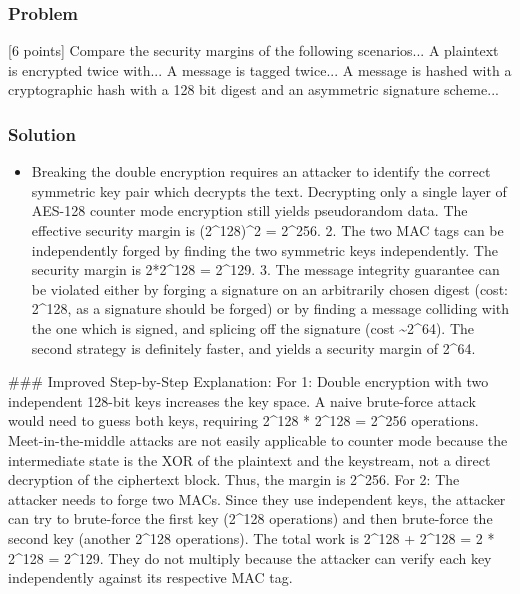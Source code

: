 \documentclass{article}
\begin{document}
\subsubsection*{Problem}
[6 points] Compare the security margins of the following scenarios... A plaintext is encrypted twice with... A message is tagged twice... A message is hashed with a cryptographic hash with a 128 bit digest and an asymmetric signature scheme...

\subsubsection*{Solution}
\begin{itemize}
    \item[\textbf{1.}] Breaking the double encryption requires an attacker to identify the correct symmetric key pair which decrypts the text. Decrypting only a single layer of AES-128 counter mode encryption still yields pseudorandom data. The effective security margin is (2\textasciicircum{}128)\textasciicircum{}2 = 2\textasciicircum{}256. 2. The two MAC tags can be independently forged by finding the two symmetric keys independently. The security margin is 2*2\textasciicircum{}128 = 2\textasciicircum{}129. 3. The message integrity guarantee can be violated either by forging a signature on an arbitrarily chosen digest (cost: 2\textasciicircum{}128, as a signature should be forged) or by finding a message colliding with the one which is signed, and splicing off the signature (cost \textasciitilde{}2\textasciicircum{}64). The second strategy is definitely faster, and yields a security margin of 2\textasciicircum{}64.

\end{itemize}
\#\#\# Improved Step-by-Step Explanation:
For 1: Double encryption with two independent 128-bit keys increases the key space. A naive brute-force attack would need to guess both keys, requiring 2\textasciicircum{}128 * 2\textasciicircum{}128 = 2\textasciicircum{}256 operations. Meet-in-the-middle attacks are not easily applicable to counter mode because the intermediate state is the XOR of the plaintext and the keystream, not a direct decryption of the ciphertext block. Thus, the margin is 2\textasciicircum{}256.
For 2: The attacker needs to forge two MACs. Since they use independent keys, the attacker can try to brute-force the first key (2\textasciicircum{}128 operations) and then brute-force the second key (another 2\textasciicircum{}128 operations). The total work is 2\textasciicircum{}128 + 2\textasciicircum{}128 = 2 * 2\textasciicircum{}128 = 2\textasciicircum{}129. They do not multiply because the attacker can verify each key independently against its respective MAC tag.
\end{document}
